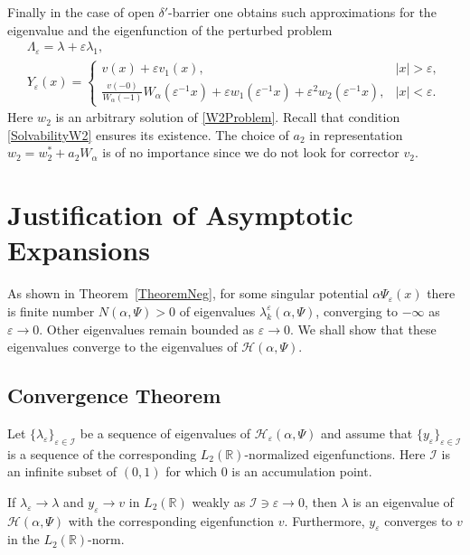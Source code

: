 \documentclass[11pt,english]{amsart}
\begin{document}
Finally in the case of  open $\delta'$-barrier one obtains such approximations for the eigenvalue and the eigenfunction of the perturbed problem
\begin{equation}\label{Approx1}
\begin{gathered}
    \Lambda_\varepsilon=\lambda +\varepsilon\lambda_1, \\ Y_\varepsilon(x)=
\begin{cases}
v (x)+\varepsilon v_1(x),  &{\left\vert{x}\right\vert}>\varepsilon,\\
\frac{v(-0)}{W_\alpha(-1)}W_\alpha(\varepsilon^{-1}x) + \varepsilon
w_1(\varepsilon^{-1}x)+\varepsilon^2 w_2(\varepsilon^{-1}x),&{\left\vert{x}\right\vert}<\varepsilon.
\end{cases}
\end{gathered}
\end{equation}
Here $w_2$ is an arbitrary solution of  \eqref{W2Problem}. Recall that condition \eqref{SolvabilityW2}
ensures its existence.
The choice of  $a_2$ in  representation $w_2=w_2^*+a_2W_\alpha$ is of no importance since we do not look for corrector $v_2$.

\section{Justification of Asymptotic Expansions}\label{SectionMainResult}
As shown in  Theorem~\ref{TheoremNeg},
for some singular potential $\alpha \Psi_\varepsilon(x)$ there is  finite number
$N(\alpha,\Psi)>0$ of eigenvalues $\lambda_k^\varepsilon(\alpha, \Psi)$, converging to $-\infty$ as $\varepsilon\to 0$. Other eigenvalues remain bounded as $\varepsilon\to 0$.  We shall show that these eigenvalues converge to the eigenvalues of  $\mathcal{H}(\alpha,\Psi)$.

\subsection{Convergence Theorem}
Let $\{\lambda_\varepsilon\}_{\varepsilon\in \mathcal{I}}$ be a sequence of eigenvalues of  $\mathcal{H}_{\varepsilon}(\alpha,\Psi)$ and  assume that $\{y_\varepsilon\}_{\varepsilon\in \mathcal{I}}$ is a sequence of the corresponding $L_2(\mathbb{R})$-normalized  eigenfunctions. Here $\mathcal{I}$ is an infinite subset of $(0,1)$ for which $0$ is an accumulation point.

\begin{g_theorem}\label{ConvergenceTheorem}
If $\lambda_\varepsilon\to \lambda$ and $y_\varepsilon \to v$ in $L_2(\mathbb{R})$ weakly as $\mathcal{I}\ni \varepsilon\to 0$, then $\lambda$ is an eigenvalue of $\mathcal{H}(\alpha,\Psi)$ with the corresponding eigenfunction $v$. Furthermore, $y_\varepsilon$ converges to $v$ in the $L_2(\mathbb{R})$-norm.
\end{g_theorem}
\end{document}
